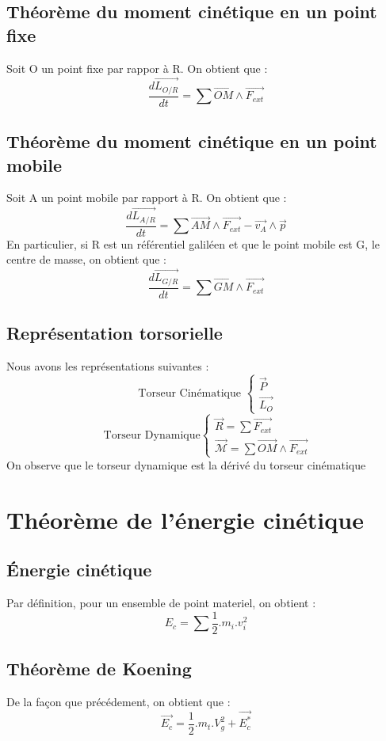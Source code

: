 \subsection{Théorème du moment cinétique en un point fixe}
Soit O un point fixe par rappor à R. On obtient que : 
$$\dfrac{d\overrightarrow{L_{O/R}}}{dt} = \sum \overrightarrow{OM}\wedge\overrightarrow{F_{ext}}$$
\subsection{Théorème du moment cinétique en un point mobile}
Soit A un point mobile par rapport à R. On obtient que : 
$$\dfrac{d\overrightarrow{L_{A/R}}}{dt} = \sum \overrightarrow{AM}\wedge\overrightarrow{F_{ext}} - \overrightarrow{v_A}\wedge\overrightarrow{p}$$
En particulier, si R est un référentiel galiléen et que le point mobile est G, le centre de masse, on obtient que :
$$\dfrac{d\overrightarrow{L_{G/R}}}{dt} = \sum \overrightarrow{GM}\wedge\overrightarrow{F_{ext}}$$
\subsection{Représentation torsorielle}
Nous avons les représentations suivantes : 
$$\mbox{ Torseur Cinématique } \begin{cases}
                                \overrightarrow{P} \\ \overrightarrow{L_O}
                               \end{cases}
$$
$$\mbox{ Torseur Dynamique} \begin{cases}
                                \overrightarrow{R} = \sum \overrightarrow{F_{ext}} \\ \overrightarrow{\mathcal{M}} = \sum \overrightarrow{OM}\wedge\overrightarrow{F_{ext}}
                               \end{cases}
$$
On observe que le torseur dynamique est la dérivé du torseur cinématique
\section{Théorème de l'énergie cinétique}
\subsection{Énergie cinétique}
\begin{de}
Par définition, pour un ensemble de point materiel, on obtient : 
$$E_c = \sum \dfrac{1}{2}.m_i.v_i^2$$
\end{de}
\subsection{Théorème de Koening}
De la façon que précédement, on obtient que : 
$$\overrightarrow{E_c} = \dfrac{1}{2}.m_t.V_g^2 + \overrightarrow{E_c^*}$$
